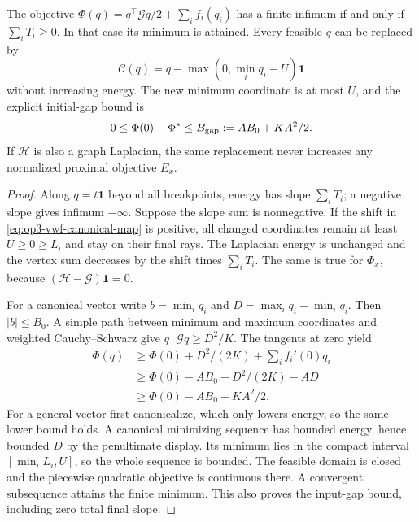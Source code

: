 \begin{proposition}
\label{prop:op3-vwf-canonical-input-gap}
The objective $\Phi(q)=q^\top\mathcal Gq/2+\sum_i f_i(q_i)$
has a finite infimum if and only if $\sum_iT_i\geq0$. In that case its
minimum is attained. Every feasible $q$ can be replaced by
\begin{equation}
 \mathcal C(q)=q-\max(0,\min_iq_i-U)\mathbf1
 \label{eq:op3-vwf-canonical-map}
\end{equation}
without increasing energy. The new minimum coordinate is at most $U$,
and the explicit initial-gap bound is
\begin{equation}
 0\leq\Phi(0)-\Phi^*\leq B_{\rm gap}:=AB_0+KA^2/2.
 \label{eq:op3-vwf-input-gap-bound}
\end{equation}
If $\mathcal H$ is also a graph Laplacian, the same replacement never
increases any normalized proximal objective $E_x$.
\end{proposition}
\begin{proof}
Along $q=t\mathbf1$ beyond all breakpoints, energy has slope
$\sum_iT_i$; a negative slope gives infimum $-\infty$.
Suppose the slope sum is nonnegative. If the shift in
\eqref{eq:op3-vwf-canonical-map} is positive, all changed coordinates
remain at least $U\geq0\geq L_i$ and stay on their final rays. The
Laplacian energy is unchanged and the vertex sum decreases by the shift
times $\sum_iT_i$. The same is true for $\Phi_x$, because
$(\mathcal H-\mathcal G)\mathbf1=0$.

For a canonical vector write $b=\min_iq_i$ and
$D=\max_iq_i-\min_iq_i$. Then $|b|\leq B_0$. A simple path between
minimum and maximum coordinates and weighted Cauchy--Schwarz give
$q^\top\mathcal Gq\geq D^2/K$. The tangents at zero yield
\begin{align*}
 \Phi(q)&\geq\Phi(0)+D^2/(2K)+\sum_i f_i'(0)q_i\\
 &\geq\Phi(0)-AB_0+D^2/(2K)-AD\\
 &\geq\Phi(0)-AB_0-KA^2/2.
\end{align*}
For a general vector first canonicalize, which only lowers energy, so
the same lower bound holds. A canonical minimizing sequence has bounded
energy, hence bounded $D$ by the penultimate display. Its minimum lies
in the compact interval $[\min_iL_i,U]$, so the whole sequence is bounded.
The feasible domain is closed and the piecewise quadratic objective is
continuous there. A convergent subsequence attains the finite minimum.
This also proves the input-gap bound, including zero total final slope.
\end{proof}

